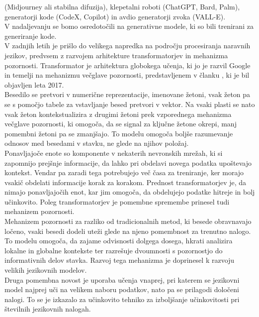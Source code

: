 \documentclass[a4paper,12pt,openright]{book}
\begin{document}
(Midjourney ali stabilna difuzija), klepetalni roboti (ChatGPT, Bard,
Palm), generatorji kode (CodeX, Copilot) in avdio
generatorji zvoka (VALL-E). \cite{Hadi_2023} \\
V nadaljevanju se bomo osredotočili na generativne modele, ki so bili trenirani za generiranje kode. \\
V zadnjih letih je prišlo do velikega napredka na področju procesiranja naravnih jezikov, predvsem z razvojem arhitekture transformatorjev in mehanizma pozornosti.
Transformator je arhitektura globokega učenja, ki jo je razvil Google in temelji na mehanizmu večglave pozornosti, predstavljenem v članku \cite{datacamp_attention_2024}, ki je bil objavljen leta 2017.   \\
Besedilo se pretvori v numerične reprezentacije, imenovane žetoni, vsak žeton pa se s pomočjo tabele za vstavljanje besed pretvori v vektor. Na vsaki plasti se nato vsak žeton kontekstualizira z drugimi žetoni prek vzporednega mehanizma večglave pozornosti, ki omogoča, da se signal za ključne žetone okrepi, manj pomembni žetoni pa se zmanjšajo. To modelu omogoča boljše razumevanje odnosov med besedami v stavku, ne glede na njihov položaj. \\
Ponavljajoče enote so komponente v nekaterih nevronskih mrežah, ki si zapomnijo prejšnje informacije, da lahko pri obdelavi novega podatka upoštevajo kontekst. Vendar pa zaradi tega potrebujejo več časa za treniranje, ker morajo vsakič obdelati informacije korak za korakom.
Prednost transformatorjev je, da nimajo ponavljajočih enot, kar jim omogoča, da obdelujejo podatke hitreje in bolj učinkovito. Poleg transformatorjev je pomembne spremembe prinesel tudi mehanizem pozornosti. \cite{NIPS2017_3f5ee243} \\
Mehanizem pozornosti za razliko od tradicionalnih metod, ki besede obravnavajo ločeno, vsaki besedi dodeli uteži glede na njeno pomembnost za trenutno nalogo. To modelu omogoča, da zajame odvisnosti dolgega dosega, hkrati analizira lokalne in globalne kontekste ter razrešuje dvoumnosti s pozornostjo do informativnih delov stavka. Razvoj tega mehanizma je doprinesel k razvoju velikih jezikovnih modelov. \cite{datacamp_attention_2024, KASNECI2023102274} \\
Druga pomembna novost je uporaba učenja vnaprej, pri katerem se jezikovni model najprej uči na velikem naboru podatkov, nato pa se prilagodi določeni nalogi. To se je izkazalo za učinkovito tehniko za izboljšanje učinkovitosti pri številnih jezikovnih nalogah. \\
\end{document}
